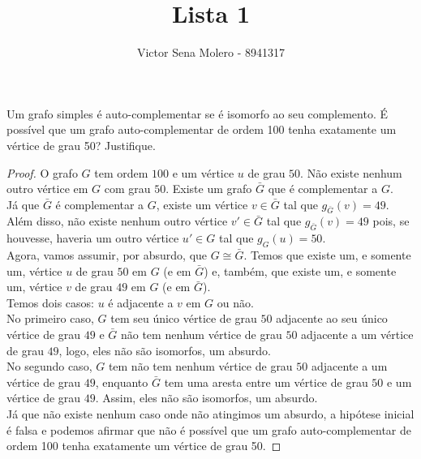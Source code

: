 \documentclass[12pt]{article}
\newenvironment{problem}[2][Ex]{\begin{trivlist}
\item[\hskip \labelsep {\bfseries #1}\hskip \labelsep {\bfseries #2.}]}{\end{trivlist}}
\begin{document}
 
 
\title{Lista 1}
\author{Victor Sena Molero - 8941317}
\maketitle
 
\begin{problem}{E3}
Um grafo simples é auto-complementar se é isomorfo ao seu complemento. É possível que um grafo auto-complementar de ordem 100 tenha exatamente um vértice de grau 50? Justifique.
\end{problem}
 
\begin{proof}
O grafo $G$ tem ordem $100$ e um vértice $u$ de grau $50$. Não existe nenhum outro vértice em $G$ com grau $50$. Existe um grafo $\bar{G}$ que é complementar a $G$. \\
Já que $\bar{G}$ é complementar a $G$, existe um vértice $v \in \bar{G}$ tal que $g_{\bar{G}}(v) = 49$. Além disso, não existe nenhum outro vértice $v' \in \bar{G}$ tal que $g_{\bar{G}}(v) = 49$ pois, se houvesse, haveria um outro vértice $u' \in G$ tal que $g_{G}(u) = 50$. \\
Agora, vamos assumir, por absurdo, que $G \cong \bar{G}$. Temos que existe um, e somente um, vértice $u$ de grau $50$ em $G$ (e em $\bar{G}$) e, também, que existe um, e somente um, vértice $v$ de grau $49$ em $G$ (e em $\bar{G}$). \\
Temos dois casos: $u$ é adjacente a $v$ em $G$ ou não. \\
No primeiro caso, $G$ tem seu único vértice de grau $50$ adjacente ao seu único vértice de grau $49$ e $\bar{G}$ não tem nenhum vértice de grau $50$ adjacente a um vértice de grau $49$, logo, eles não são isomorfos, um absurdo. \\
No segundo caso, $G$ tem não tem nenhum vértice de grau $50$ adjacente a um vértice de grau $49$, enquanto $\bar{G}$ tem uma aresta entre um vértice de grau $50$ e um vértice de grau $49$. Assim, eles não são isomorfos, um absurdo. \\
Já que não existe nenhum caso onde não atingimos um absurdo, a hipótese inicial é falsa e podemos afirmar que não é possível que um grafo auto-complementar de ordem 100 tenha exatamente um vértice de grau 50.
\end{proof}
\end{document}
